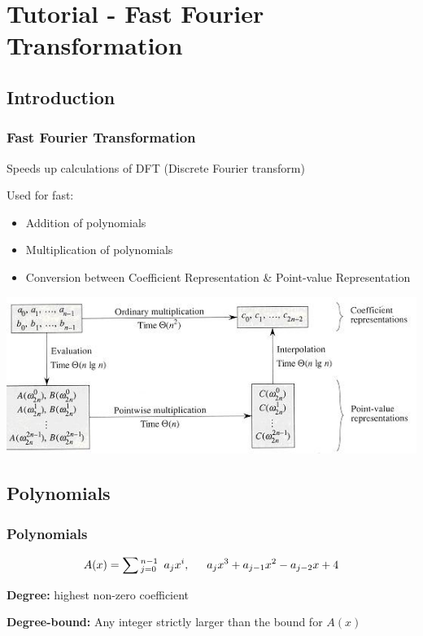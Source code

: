 \section{Tutorial - Fast Fourier Transformation }

\subsection{Introduction}

\begin{frame}
\frametitle{Fast Fourier Transformation}

Speeds up calculations of DFT (Discrete Fourier transform)

Used for fast:
\begin{itemize}
\item Addition of polynomials
\item Multiplication of polynomials
\item Conversion between Coefficient Representation \& Point-value Representation
\end{itemize}

\includegraphics[scale=0.5]{images/poly-transform.jpg}

\end{frame}

\subsection{Polynomials}

\begin{frame}
\frametitle{Polynomials}
\begin{equation}
A(x) = \sum{^{n-1}_{j=0} \hspace{0.5em} a_jx^i}, \hspace{1.5em} a_j x^3 + a_{j-1} x^2 - a_{j-2} x + 4
\end{equation}


\textbf{Degree:} highest non-zero coefficient 

\textbf{Degree-bound:} Any integer strictly larger than the bound for $A(x)$

\end{frame}


